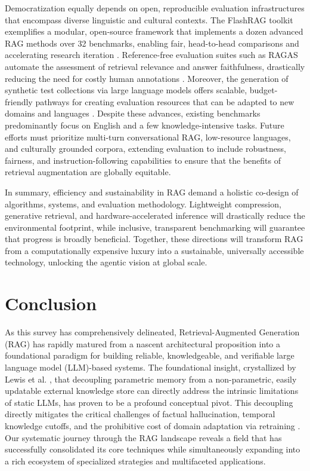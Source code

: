\documentclass[11pt,a4paper]{article}
\begin{document}
Democratization equally depends on open, reproducible evaluation infrastructures that encompass diverse linguistic and cultural contexts. The FlashRAG toolkit exemplifies a modular, open-source framework that implements a dozen advanced RAG methods over 32 benchmarks, enabling fair, head-to-head comparisons and accelerating research iteration \cite{arxiv:2405.13576v1}. Reference-free evaluation suites such as RAGAS automate the assessment of retrieval relevance and answer faithfulness, drastically reducing the need for costly human annotations \cite{arxiv:2309.15217v1}. Moreover, the generation of synthetic test collections via large language models offers scalable, budget-friendly pathways for creating evaluation resources that can be adapted to new domains and languages \cite{arxiv:2405.07767v1}. Despite these advances, existing benchmarks predominantly focus on English and a few knowledge-intensive tasks. Future efforts must prioritize multi-turn conversational RAG, low-resource languages, and culturally grounded corpora, extending evaluation to include robustness, fairness, and instruction-following capabilities to ensure that the benefits of retrieval augmentation are globally equitable.

In summary, efficiency and sustainability in RAG demand a holistic co-design of algorithms, systems, and evaluation methodology. Lightweight compression, generative retrieval, and hardware-accelerated inference will drastically reduce the environmental footprint, while inclusive, transparent benchmarking will guarantee that progress is broadly beneficial. Together, these directions will transform RAG from a computationally expensive luxury into a sustainable, universally accessible technology, unlocking the agentic vision at global scale.


\section{Conclusion}


As this survey has comprehensively delineated, Retrieval-Augmented Generation (RAG) has rapidly matured from a nascent architectural proposition into a foundational paradigm for building reliable, knowledgeable, and verifiable large language model (LLM)-based systems. The foundational insight, crystallized by Lewis et al. \cite{arxiv:2005.11401v4}, that decoupling parametric memory from a non-parametric, easily updatable external knowledge store can directly address the intrinsic limitations of static LLMs, has proven to be a profound conceptual pivot. This decoupling directly mitigates the critical challenges of factual hallucination, temporal knowledge cutoffs, and the prohibitive cost of domain adaptation via retraining \cite{arxiv:2112.04426v3,arxiv:2208.03299v3}. Our systematic journey through the RAG landscape reveals a field that has successfully consolidated its core techniques while simultaneously expanding into a rich ecosystem of specialized strategies and multifaceted applications.
\end{document}
